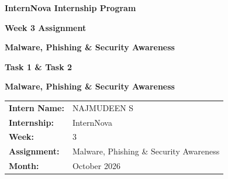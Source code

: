 \documentclass[12pt,a4paper]{article}
\begin{document}
\pagestyle{empty}


\begin{titlepage}
\centering
\vspace*{1.5cm}

{\Large\textbf{InternNova Internship Program}\par}
\vspace{0.8cm}

{\large\textbf{Week 3 Assignment}\par}
\vspace{1.2cm}

{\LARGE\textbf{Malware, Phishing \& Security Awareness}\par}
\vspace{1.0cm}

{\Large\textbf{Task 1 \& Task 2}\par}
\vspace{0.6cm}

{\large\textbf{Malware, Phishing \& Security Awareness}\par}

\vfill

\begin{tabular}{>{\bfseries}l l}
Intern Name: & NAJMUDEEN S\\
Internship: & InternNova\\
Week: & 3\\
Assignment: & Malware, Phishing \& Security Awareness\\
Month: & October 2026\\
\end{tabular}

\vfill

\end{titlepage}

\clearpage
\thispagestyle{empty}
\tableofcontents

\clearpage
{}
\setcounter{page}{1}
\pagestyle{fancy}
\end{document}
